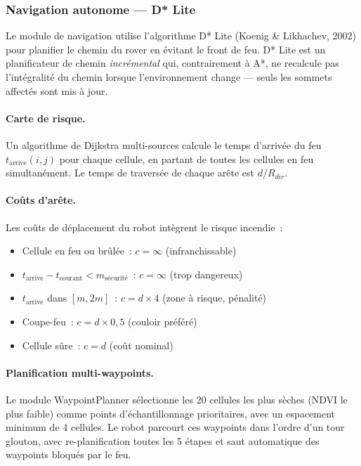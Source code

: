 \subsubsection{Navigation autonome --- D* Lite}

Le module de navigation utilise l'algorithme D* Lite (Koenig \& Likhachev, 2002) pour planifier le chemin du rover en évitant le front de feu. D* Lite est un planificateur de chemin \textit{incrémental} qui, contrairement à A*, ne recalcule pas l'intégralité du chemin lorsque l'environnement change --- seuls les sommets affectés sont mis à jour.

\paragraph{Carte de risque.} Un algorithme de Dijkstra multi-sources calcule le temps d'arrivée du feu $t_{\text{arrive}}(i,j)$ pour chaque cellule, en partant de toutes les cellules en feu simultanément. Le temps de traversée de chaque arête est $d / R_{dir}$.

\paragraph{Coûts d'arête.} Les coûts de déplacement du robot intègrent le risque incendie~:
\begin{itemize}[nosep]
    \item Cellule en feu ou brûlée~: $c = \infty$ (infranchissable)
    \item $t_{\text{arrive}} - t_{\text{courant}} < m_{\text{sécurité}}$~: $c = \infty$ (trop dangereux)
    \item $t_{\text{arrive}}$ dans $[m, 2m]$~: $c = d \times 4$ (zone à risque, pénalité)
    \item Coupe-feu~: $c = d \times 0{,}5$ (couloir préféré)
    \item Cellule sûre~: $c = d$ (coût nominal)
\end{itemize}

\paragraph{Planification multi-waypoints.} Le module WaypointPlanner sélectionne les 20 cellules les plus sèches (NDVI le plus faible) comme points d'échantillonnage prioritaires, avec un espacement minimum de 4 cellules. Le robot parcourt ces waypoints dans l'ordre d'un tour glouton, avec re-planification toutes les 5 étapes et saut automatique des waypoints bloqués par le feu.

